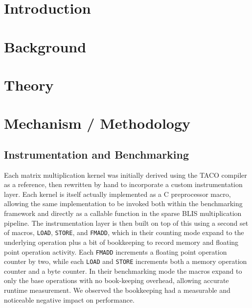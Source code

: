 \documentclass[sigconf]{acmart}
\begin{document}



\maketitle

\section{Introduction}

\section{Background}

\section{Theory}

\section{Mechanism / Methodology}

\subsection{Instrumentation and Benchmarking}
Each matrix multiplication kernel was initially derived using the TACO compiler as a reference,
then rewritten by hand to incorporate a custom instrumentation layer. Each kernel is
itself actually implemented as a C preprocessor macro, allowing the same implementation
to be invoked both within the benchmarking framework and directly as a callable
function in the sparse BLIS multiplication pipeline. The instrumentation layer is then
built on top of this using a second set of macros, \texttt{LOAD}, \texttt{STORE},
and \texttt{FMADD}, which in their counting mode expand to the underlying operation
plus a bit of bookkeeping to record memory and floating point operation activity.
Each \texttt{FMADD} increments a floating point operation counter by two, while
each \texttt{LOAD} and \texttt{STORE} increments both a memory operation counter and a
byte counter. In their benchmarking mode the macros expand to only the base operations with
no book-keeping overhead, allowing accurate runtime measurement. We observed the bookkeeping
had a measurable and noticeable negative impact on performance.
\end{document}
